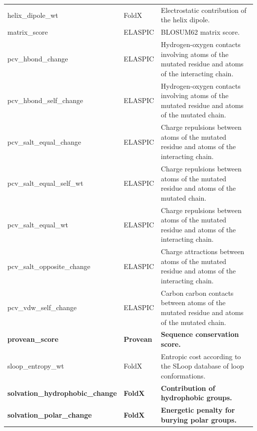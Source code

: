 \begin{table}[tb]
\begin{tabular}{ l | l | p{7cm} }
		helix\_dipole\_wt                         & FoldX            & Electrostatic contribution of the helix dipole.                                                     \\
		matrix\_score                             & ELASPIC          & BLOSUM62 matrix score.                                                                              \\
		pcv\_hbond\_change                        & ELASPIC          & Hydrogen-oxygen contacts involving atoms of the mutated residue and atoms of the interacting chain. \\
		pcv\_hbond\_self\_change                  & ELASPIC          & Hydrogen-oxygen contacts involving atoms of the mutated residue and atoms of the mutated chain.     \\
		pcv\_salt\_equal\_change                  & ELASPIC          & Charge repulsions between atoms of the mutated residue and atoms of the interacting chain.          \\
		pcv\_salt\_equal\_self\_wt                & ELASPIC          & Charge repulsions between atoms of the mutated residue and atoms of the mutated chain.              \\
		pcv\_salt\_equal\_wt                      & ELASPIC          & Charge repulsions between atoms of the mutated residue and atoms of the interacting chain.          \\
		pcv\_salt\_opposite\_change               & ELASPIC          & Charge attractions between atoms of the mutated residue and atoms of the interacting chain.         \\
		pcv\_vdw\_self\_change                    & ELASPIC          & Carbon carbon contacts between atoms of the mutated residue and atoms of the mutated chain.         \\
		\textbf{provean\_score}                   & \textbf{Provean} & \textbf{Sequence conservation score.}                                                               \\
		sloop\_entropy\_wt                        & FoldX            & Entropic cost according to the SLoop database of loop conformations.                                \\
		\textbf{solvation\_hydrophobic\_change}   & \textbf{FoldX}   & \textbf{Contribution of hydrophobic groups.}                                                        \\
		\textbf{solvation\_polar\_change}         & \textbf{FoldX}   & \textbf{Energetic penalty for burying polar groups.}                                                \\

\end{tabular}
\end{table}
